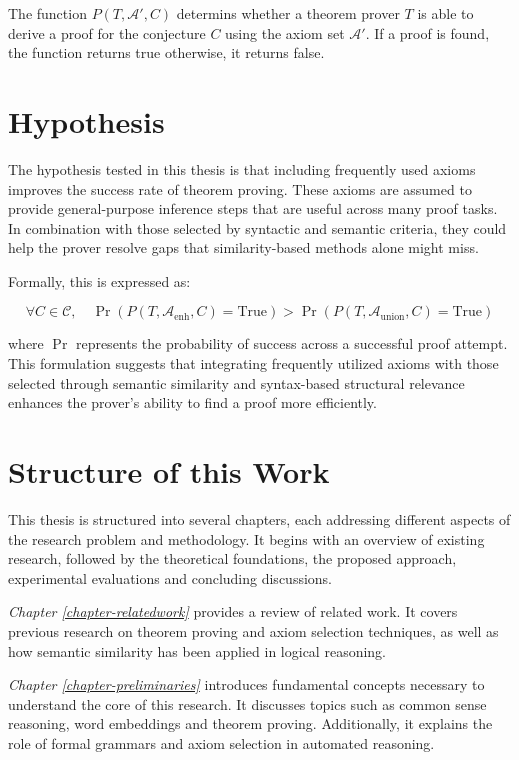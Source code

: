 \documentclass[english,version-2020-11]{uzl-thesis}
\begin{document}
The function \( P(T, \mathcal{A}', C) \) determins whether a theorem prover \( T \) is able to derive a proof for the conjecture \( C \) using the axiom set \( \mathcal{A}' \). If a proof is found, the function returns true otherwise, it returns false.

\section{Hypothesis}

The hypothesis tested in this thesis is that including frequently used axioms improves the success rate of theorem proving. These axioms are assumed to provide general-purpose inference steps that are useful across many proof tasks. In combination with those selected by syntactic and semantic criteria, they could help the prover resolve gaps that similarity-based methods alone might miss.

Formally, this is expressed as:

\begin{equation}
    \forall C \in \mathcal{C}, \quad \Pr(P(T, \mathcal{A}_{\text{enh}}, C) = \text{True}) > \Pr(P(T, \mathcal{A}_{\text{union}}, C) = \text{True})
\end{equation}

where \( \Pr \) represents the probability of success across a successful proof attempt. This formulation suggests that integrating frequently utilized axioms with those selected through semantic similarity and syntax-based structural relevance enhances the prover’s ability to find a proof more efficiently.


\section{Structure of this Work}

This thesis is structured into several chapters, each addressing different aspects of the research problem and methodology. It begins with an overview of existing research, followed by the theoretical foundations, the proposed approach, experimental evaluations and concluding discussions.

\textit{Chapter \ref{chapter-relatedwork}} provides a review of related work. It covers previous research on theorem proving and axiom selection techniques, as well as how semantic similarity has been applied in logical reasoning.

\textit{Chapter \ref{chapter-preliminaries}} introduces fundamental concepts necessary to understand the core of this research. It discusses topics such as common sense reasoning, word embeddings and theorem proving. Additionally, it explains the role of formal grammars and axiom selection in automated reasoning.
\end{document}

